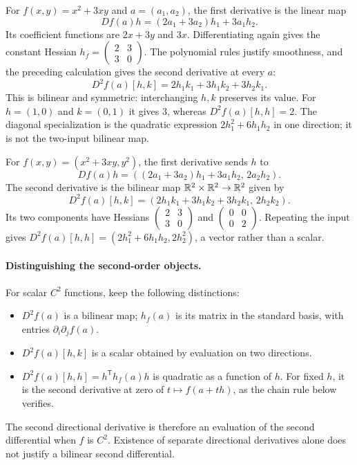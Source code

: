 \begin{example}
For $f(x,y)=x^2+3xy$ and $a=(a_1,a_2)$, the first derivative is the
linear map
\[
Df(a)h=(2a_1+3a_2)h_1+3a_1h_2.
\]
Its coefficient functions are $2x+3y$ and $3x$.
Differentiating again gives the constant Hessian
$h_f=\left(\begin{smallmatrix}2&3\\3&0\end{smallmatrix}\right)$.
The polynomial rules justify smoothness, and the preceding calculation
gives the second derivative at every $a$:
\[
D^2f(a)[h,k]=2h_1k_1+3h_1k_2+3h_2k_1.
\]
This is bilinear and symmetric: interchanging $h,k$ preserves its value.
For $h=(1,0)$ and $k=(0,1)$ it gives $3$, whereas
$D^2f(a)[h,h]=2$. The diagonal specialization is the quadratic expression
$2h_1^2+6h_1h_2$ in one direction; it is not the two-input bilinear map.
\end{example}
\begin{example}
\label{ex:vector-second-differential}
For $f(x,y)=(x^2+3xy,y^2)$, the first derivative sends $h$ to
\[
Df(a)h=((2a_1+3a_2)h_1+3a_1h_2,\,2a_2h_2).
\]
The second derivative is the bilinear map $\mathbb{R}^2\times\mathbb{R}^2\to\mathbb{R}^2$
given by
\[
D^2f(a)[h,k]=(2h_1k_1+3h_1k_2+3h_2k_1,\,2h_2k_2).
\]
Its two components have Hessians
$\left(\begin{smallmatrix}2&3\\3&0\end{smallmatrix}\right)$ and
$\left(\begin{smallmatrix}0&0\\0&2\end{smallmatrix}\right)$.
Repeating the input gives
$D^2f(a)[h,h]=(2h_1^2+6h_1h_2,2h_2^2)$, a vector rather than a scalar.
\end{example}

\paragraph{Distinguishing the second-order objects.}
For scalar $C^2$ functions, keep the following distinctions:
\begin{itemize}
\item $D^2f(a)$ is a bilinear map; $h_f(a)$ is its matrix in the
standard basis, with entries $\partial_i\partial_j f(a)$.
\item $D^2f(a)[h,k]$ is a scalar obtained by evaluation on two directions.
\item $D^2f(a)[h,h]=h^{\mathsf T}h_f(a)h$ is quadratic as a function of
$h$. For fixed $h$, it is the second derivative at zero of
$t\mapsto f(a+th)$, as the chain rule below verifies.
\end{itemize}
The second directional derivative is therefore an evaluation of the
second differential when $f$ is $C^2$. Existence of separate directional
derivatives alone does not justify a bilinear second differential.

